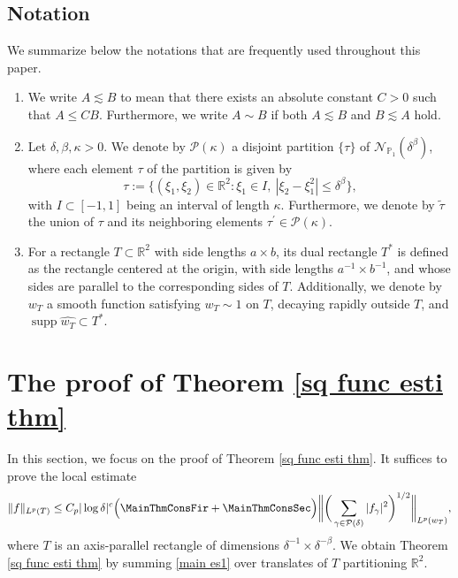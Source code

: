 \documentclass[reqno,centertags,11pt,a4paper]{amsart}
\begin{document}
\subsection*{Notation}
We summarize below the notations that are frequently used throughout this paper.
\begin{enumerate}
    \item We write $A \lesssim B$ to mean that there exists an absolute constant $C > 0$ such that $A \leq C B$.
Furthermore, we write $A \sim B$ if both $A \lesssim B$ and $B \lesssim A$ hold.
    \item Let \( \delta,\beta,\kappa>0 \). We denote by \( \mathcal{P}(\kappa) \) a disjoint partition \( \{\tau\} \) of \( \mathcal{N}_{\mathbb{P}_1}(\delta^\beta) \), where each element \( \tau \) of the partition is given by
\[
\tau := \bigl\{ (\xi_1, \xi_2) \in \mathbb{R}^2 : \xi_1 \in I,\ |\xi_2 - \xi_1^2| \le \delta^\beta \bigr\},
\]
with \( I\subset[-1,1] \) being an interval of length \( \kappa \). Furthermore, we denote by \( \widetilde{\tau} \) the union of \( \tau \) and its neighboring elements \( \tau^\prime\in\mathcal{P}(\kappa) \).
    \item For a rectangle $T \subset \mathbb{R}^2$ with side lengths $a \times b$, its dual rectangle $T^*$ is defined as the rectangle centered at the origin, with side lengths $a^{-1} \times b^{-1}$, and whose sides are parallel to the corresponding sides of $T$. Additionally, we denote by $w_T$ a smooth function satisfying $w_T \sim 1$ on $T$, decaying rapidly outside $T$, and $\operatorname{supp}\widehat{w_T} \subset T^*$.
\end{enumerate}

 \section{The proof of Theorem \ref{sq func esti thm}}\label{S2}
In this section, we focus on the proof of Theorem \ref{sq func esti thm}.
It suffices to prove the local estimate
\begin{equation}\label{main es1}
  \|f\|_{L^p(T)} \leq C_p |\log\delta|^{c}\Bigl( \MainThmConsFir + \MainThmConsSec \Bigr)  \bigg\|\bigg(\sum_{\gamma\in\mathcal{P}(\delta) }|f_\gamma|^2\bigg)^{1/2}\bigg\|_{L^p(w_T)},
\end{equation}
where $T$ is an axis-parallel rectangle of dimensions $\delta^{-1} \times \delta^{-\beta}$. We obtain Theorem \ref{sq func esti thm} by summing \eqref{main es1} over translates of $T$ partitioning $\mathbb{R}^2$.
\end{document}
